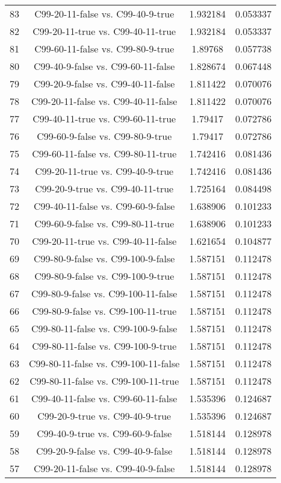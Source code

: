 \documentclass[a4paper,10pt]{article}
\begin{document}
\begin{landscape}
\begin{table}[!htp]
\begin{tabular}{cccc}
83&C99-20-11-false vs. C99-40-9-true&1.932184&0.053337\\
82&C99-20-11-true vs. C99-40-11-true&1.932184&0.053337\\
81&C99-60-11-false vs. C99-80-9-true&1.89768&0.057738\\
80&C99-40-9-false vs. C99-60-11-false&1.828674&0.067448\\
79&C99-20-9-false vs. C99-40-11-false&1.811422&0.070076\\
78&C99-20-11-false vs. C99-40-11-false&1.811422&0.070076\\
77&C99-40-11-true vs. C99-60-11-true&1.79417&0.072786\\
76&C99-60-9-false vs. C99-80-9-true&1.79417&0.072786\\
75&C99-60-11-false vs. C99-80-11-true&1.742416&0.081436\\
74&C99-20-11-true vs. C99-40-9-true&1.742416&0.081436\\
73&C99-20-9-true vs. C99-40-11-true&1.725164&0.084498\\
72&C99-40-11-false vs. C99-60-9-false&1.638906&0.101233\\
71&C99-60-9-false vs. C99-80-11-true&1.638906&0.101233\\
70&C99-20-11-true vs. C99-40-11-false&1.621654&0.104877\\
69&C99-80-9-false vs. C99-100-9-false&1.587151&0.112478\\
68&C99-80-9-false vs. C99-100-9-true&1.587151&0.112478\\
67&C99-80-9-false vs. C99-100-11-false&1.587151&0.112478\\
66&C99-80-9-false vs. C99-100-11-true&1.587151&0.112478\\
65&C99-80-11-false vs. C99-100-9-false&1.587151&0.112478\\
64&C99-80-11-false vs. C99-100-9-true&1.587151&0.112478\\
63&C99-80-11-false vs. C99-100-11-false&1.587151&0.112478\\
62&C99-80-11-false vs. C99-100-11-true&1.587151&0.112478\\
61&C99-40-11-false vs. C99-60-11-false&1.535396&0.124687\\
60&C99-20-9-true vs. C99-40-9-true&1.535396&0.124687\\
59&C99-40-9-true vs. C99-60-9-false&1.518144&0.128978\\
58&C99-20-9-false vs. C99-40-9-false&1.518144&0.128978\\
57&C99-20-11-false vs. C99-40-9-false&1.518144&0.128978\\

\end{tabular}
\end{table}
\end{landscape}
\end{document}
